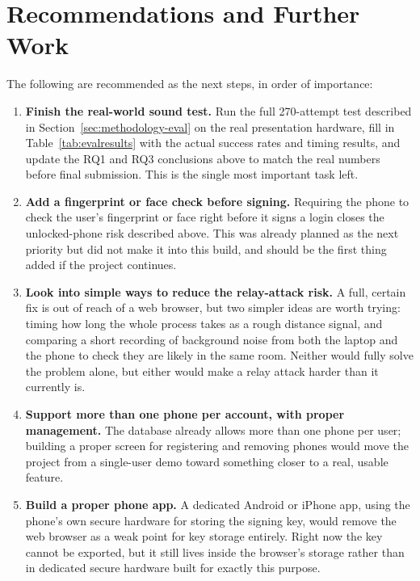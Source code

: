 \section{Recommendations and Further Work}
\label{sec:further-work}

The following are recommended as the next steps, in order of importance:

\begin{enumerate}[label=\arabic*.]
  \item \textbf{Finish the real-world sound test.} Run the full
  270-attempt test described in Section~\ref{sec:methodology-eval} on the
  real presentation hardware, fill in Table~\ref{tab:evalresults} with the
  actual success rates and timing results, and update the RQ1 and RQ3
  conclusions above to match the real numbers before final submission.
  This is the single most important task left.
  \item \textbf{Add a fingerprint or face check before signing.}
  Requiring the phone to check the user's fingerprint or face right
  before it signs a login closes the unlocked-phone risk described above.
  This was already planned as the next priority but did not make it into
  this build, and should be the first thing added if the project
  continues.
  \item \textbf{Look into simple ways to reduce the relay-attack risk.}
  A full, certain fix is out of reach of a web browser, but two simpler
  ideas are worth trying: timing how long the whole process takes as a
  rough distance signal, and comparing a short recording of background
  noise from both the laptop and the phone to check they are likely in the
  same room. Neither would fully solve the problem alone, but either would
  make a relay attack harder than it currently is.
  \item \textbf{Support more than one phone per account, with proper
  management.} The database already allows more than one phone per user;
  building a proper screen for registering and removing phones would move
  the project from a single-user demo toward something closer to a real,
  usable feature.
  \item \textbf{Build a proper phone app.} A dedicated Android or iPhone
  app, using the phone's own secure hardware for storing the signing key,
  would remove the web browser as a weak point for key storage entirely.
  Right now the key cannot be exported, but it still lives inside the
  browser's storage rather than in dedicated secure hardware built for
  exactly this purpose.
\end{enumerate}

